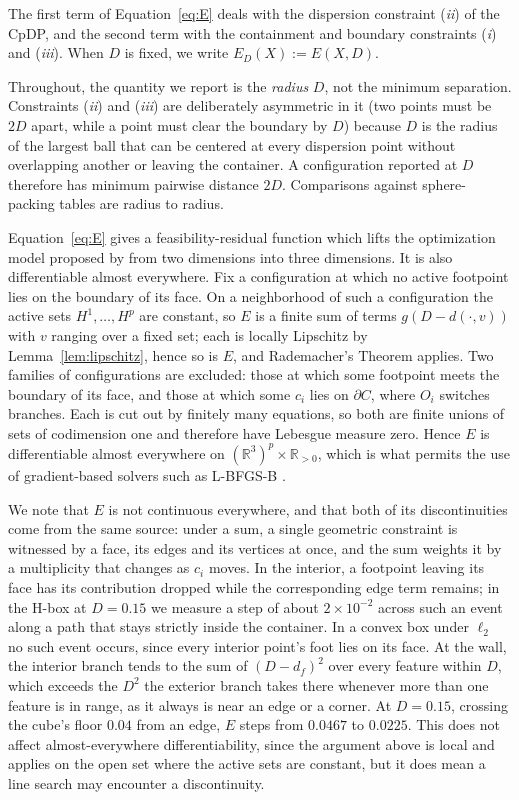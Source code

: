 \documentclass[preprint,12pt]{elsarticle}
\theoremstyle{remark}
\def \R {\mathbb{R}}
\newcommand{\paren}[1]{\left( #1 \right)}
\begin{document}
The first term of Equation~\ref{eq:E} deals with the dispersion constraint
(\textit{ii}) of the CpDP, and the second term with the containment and boundary
constraints (\textit{i}) and (\textit{iii}). When $D$ is fixed, we write $E_D(X)
:= E(X, D)$.

Throughout, the quantity we report is the \emph{radius} $D$, not the minimum
separation. Constraints (\textit{ii}) and (\textit{iii}) are deliberately
asymmetric in it (two points must be $2D$ apart, while a point must clear the
boundary by $D$) because $D$ is the radius of the largest ball that can be
centered at every dispersion point without overlapping another or leaving the
container. A configuration reported at $D$ therefore has minimum pairwise
distance $2D$. Comparisons against sphere-packing tables \citep{packomania,
schaer1966} are radius to radius.

Equation~\ref{eq:E} gives a feasibility-residual function which lifts the
optimization model proposed by \citet{lai2024} from two dimensions into three
dimensions. It is also differentiable almost everywhere. Fix a configuration at
which no active footpoint lies on the boundary of its face. On a neighborhood of
such a configuration the active sets $H^1, \dots, H^p$ are constant, so $E$ is a
finite sum of terms $g \paren{D - d(\cdot, v)}$ with $v$ ranging over a fixed
set; each is locally Lipschitz by Lemma~\ref{lem:lipschitz}, hence so is $E$,
and Rademacher's Theorem applies. Two families of configurations are excluded:
those at which some footpoint meets the boundary of its face, and those at which
some $c_i$ lies on $\partial C$, where $O_i$ switches branches. Each is cut out
by finitely many equations, so both are finite unions of sets of codimension one
and therefore have Lebesgue measure zero. Hence $E$ is differentiable almost
everywhere on $(\R^3)^p \times \R_{>0}$, which is what permits the use of
gradient-based solvers such as L-BFGS-B \citep{fletcher1987, byrd1995}.

We note that $E$ is not continuous everywhere, and that both of its
discontinuities come from the same source: under a sum, a single geometric
constraint is witnessed by a face, its edges and its vertices at once, and the
sum weights it by a multiplicity that changes as $c_i$ moves. In the interior, a
footpoint leaving its face has its contribution dropped while the corresponding
edge term remains; in the H-box at $D = 0.15$ we measure a step of about $2
\times 10^{-2}$ across such an event along a path that stays strictly inside the
container. In a convex box under $\ell_2$ no such event occurs, since every
interior point's foot lies on its face. At the wall, the interior branch tends
to the sum of $(D - d_f)^2$ over every feature within $D$, which exceeds the
$D^2$ the exterior branch takes there whenever more than one feature is in
range, as it always is near an edge or a corner. At $D = 0.15$, crossing the
cube's floor $0.04$ from an edge, $E$ steps from $0.0467$ to $0.0225$. This does
not affect almost-everywhere differentiability, since the argument above is
local and applies on the open set where the active sets are constant, but it
does mean a line search may encounter a discontinuity.
\end{document}

